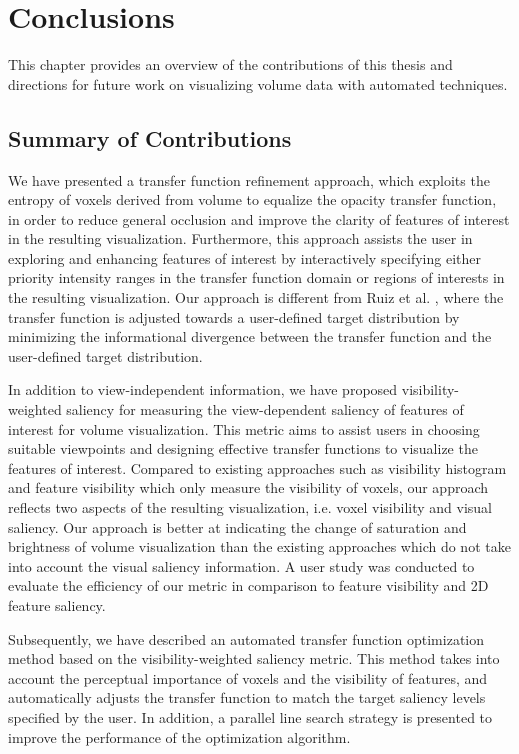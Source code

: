 \chapter{Conclusions \label{conclusions}}

This chapter provides an overview of the contributions of this thesis and directions for future work on visualizing volume data with automated techniques.

\section{Summary of Contributions}
We have presented a transfer function refinement approach, which exploits the entropy of voxels derived from volume to equalize the opacity transfer function, in order to reduce general occlusion and improve the clarity of features of interest in the resulting visualization.
Furthermore, this approach assists the user in exploring and enhancing features of interest by interactively specifying either priority intensity ranges in the transfer function domain or regions of interests in the resulting visualization.
Our approach is different from Ruiz et al. \cite{ruiz_automatic_2011}, where the transfer function is adjusted towards a user-defined target distribution by minimizing the informational divergence between the transfer function and the user-defined target distribution.

In addition to view-independent information, we have proposed visibility-weighted saliency for measuring the view-dependent saliency of features of interest for volume visualization.
This metric aims to assist users in choosing suitable viewpoints and designing effective transfer functions to visualize the features of interest.
Compared to existing approaches such as visibility histogram \cite{correa_visibility_2011} and feature visibility \cite{wang_efficient_2011} which only measure the visibility of voxels, our approach reflects two aspects of the resulting visualization, i.e. voxel visibility and visual saliency. Our approach is better at indicating the change of saturation and brightness of volume visualization than the existing approaches which do not take into account the visual saliency information. A user study was conducted to evaluate the efficiency of our metric in comparison to feature visibility and 2D feature saliency.

Subsequently, we have described an automated transfer function optimization method based on the visibility-weighted saliency metric. This method takes into account the perceptual importance of voxels and the visibility of features, and automatically adjusts the transfer function to match the target saliency levels specified by the user. In addition, a parallel line search strategy is presented to improve the performance of the optimization algorithm.

